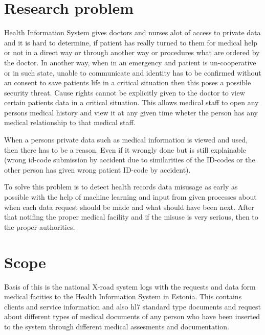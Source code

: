 \documentclass[12pt]{article}
\begin{document}
\section{Research problem}
Health Information System gives doctors and nurses alot of access to private data and it is hard to determine, if patient has really turned to them for medical help or not in a direct way or through another way or procedures what are ordered by the doctor. 
In another way, when in an emergency and patient is un-cooperative or in such state, unable to communicate and identity has to be confirmed without an consent to save patients life in a critical situation then this poses a possible security threat. Cause rights cannot be explicitly given to the doctor to view certain patients data in a critical situation. 
This allows medical staff to open any persons medical history and view it at any given time wheter the person has any medical relationship to that medical staff. 

When a persons private data such as medical information is viewed and used, then there has to be a reason. Even if it wrongly done but is still explainable (wrong id-code submission by accident due to similarities of the ID-codes or the other person has given wrong patient ID-code by accident). 

To solve this problem is to detect health records data misusage as early as possible with the help of machine learning and input from given processes about when each data request should be made and what should have been next. After that notifing the proper medical facility and if the misuse is very serious, then to the proper authorities. 

\section{Scope}
Basis of this is the national X-road system logs with the requests and data form medical facities to the Health Information System in Estonia. 
This contains clients and service information and also hl7 standard type documents and request about different types of medical documents of any person who have been inserted to the system through different medical assesments and documentation. 
\end{document}
